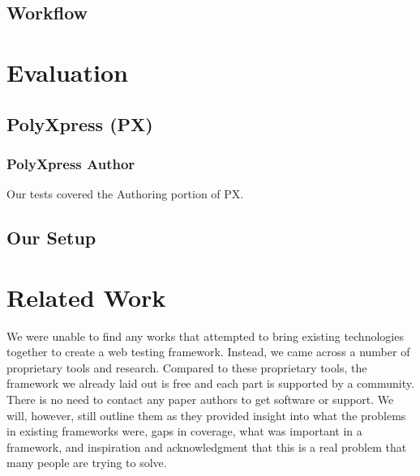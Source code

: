 \documentclass[11pt]{article}
\begin{document}

\subsection{Workflow}



\section{Evaluation}

\subsection{PolyXpress (PX)}

\subsubsection{PolyXpress Author}
Our tests covered the Authoring portion of PX.

\subsection{Our Setup}



\section{Related Work}
We were unable to find any works that attempted to bring existing technologies together to create a web testing framework. Instead, we came across a number of proprietary tools and research. Compared to these proprietary tools, the framework we already laid out is free and each part is supported by a community. There is no need to contact any paper authors to get software or support. We will, however, still outline them as they provided insight into what the problems in existing frameworks were, gaps in coverage, what was important in a framework, and inspiration and acknowledgment that this is a real problem that many people are trying to solve.
\end{document}
